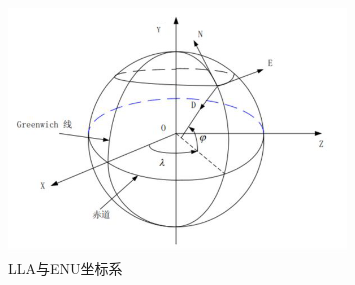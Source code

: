 \begin{figure}[h!]
    \begin{center}
        \includegraphics[width=0.8\textwidth]{pictures/ecef.png}
        \caption{LLA与ENU坐标系}
        \label{llaneu}
    \end{center}
\end{figure}
